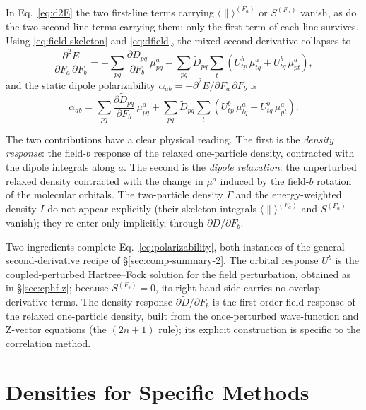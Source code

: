\documentclass[12pt]{article}
\newcommand{\adb}[2]{\langle #1 \| #2 \rangle}
\begin{document}
In Eq.~\eqref{eq:d2E} the two first-line terms carrying $\adb{}{}^{(F_a)}$ or
$S^{(F_a)}$ vanish, as do the two second-line terms carrying them; only the
first term of each line survives.  Using \eqref{eq:field-skeleton} and
\eqref{eq:dfield}, the mixed second derivative collapses to
\begin{equation}
\frac{\partial^2 E}{\partial F_a\,\partial F_b}
= -\sum_{pq}\frac{\partial \tilde D_{pq}}{\partial F_b}\,\mu^a_{pq}
  -\sum_{pq}\tilde D_{pq}\sum_t\left(U^b_{tp}\,\mu^a_{tq}+U^b_{tq}\,\mu^a_{pt}\right),
\end{equation}
and the static dipole polarizability
$\alpha_{ab}=-\partial^2 E/\partial F_a\,\partial F_b$ is
\begin{equation}
\alpha_{ab}
= \sum_{pq}\frac{\partial \tilde D_{pq}}{\partial F_b}\,\mu^a_{pq}
+ \sum_{pq}\tilde D_{pq}\sum_t\left(U^b_{tp}\,\mu^a_{tq}+U^b_{tq}\,\mu^a_{pt}\right).
\label{eq:polarizability}
\end{equation}

The two contributions have a clear physical reading.  The first is the {\em
density response}: the field-$b$ response of the relaxed one-particle density,
contracted with the dipole integrals along $a$.  The second is the {\em dipole
relaxation}: the unperturbed relaxed density contracted with the change in
$\mu^a$ induced by the field-$b$ rotation of the molecular orbitals.  The
two-particle density $\Gamma$ and the energy-weighted density $I$ do not appear
explicitly (their skeleton integrals $\adb{}{}^{(F_a)}$ and $S^{(F_a)}$ vanish);
they re-enter only implicitly, through $\partial\tilde D/\partial F_b$.

Two ingredients complete Eq.~\eqref{eq:polarizability}, both instances of the
general second-derivative recipe of \S\ref{sec:comp-summary-2}.  The orbital
response $U^b$ is the coupled-perturbed Hartree--Fock solution for the field
perturbation, obtained as in \S\ref{sec:cphf-z}; because $S^{(F_b)}=0$, its
right-hand side carries no overlap-derivative terms.  The density response
$\partial\tilde D/\partial F_b$ is the first-order field response of the relaxed
one-particle density, built from the once-perturbed wave-function and Z-vector
equations (the $(2n+1)$ rule); its explicit construction is specific to the
correlation method.

\appendix

\section{Densities for Specific Methods}
\label{sec:densities}
\end{document}
